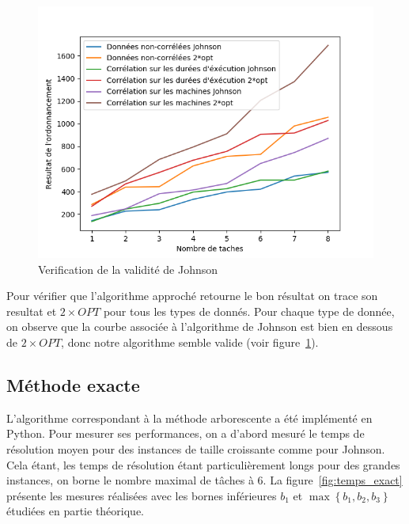 \documentclass[a4paper, 10pt]{article}
\begin{document}
		\begin{figure}[H]
			\centering
			\includegraphics[width=0.8\linewidth]{graphes/validite_Johnson.png}
			\caption{Verification de la validité de Johnson}
			\label{fig:validiteJ}
		\end{figure}
                	
		Pour vérifier que l'algorithme approché retourne le bon résultat on trace son resultat et $2 \times OPT$ pour tous les types de donnés. Pour chaque type de donnée, on observe que la courbe associée à l'algorithme de Johnson est bien en dessous de $2 \times OPT$, donc notre algorithme semble valide (voir figure~\ref{fig:validiteJ}).
		
		\subsection*{Méthode exacte}
		
	L'algorithme correspondant à la méthode arborescente a été implémenté en Python. Pour mesurer ses performances, on a d'abord mesuré le temps de résolution moyen pour des instances de taille croissante comme pour Johnson. Cela étant, les temps de résolution étant particulièrement longs pour des grandes instances, on borne le nombre maximal de tâches à 6. La figure~\ref{fig:temps_exact} présente les mesures réalisées avec les bornes inférieures $b_1$ et $\max\left\{ b_1, b_2, b_3 \right\}$ étudiées en partie théorique.
		
\end{document}
